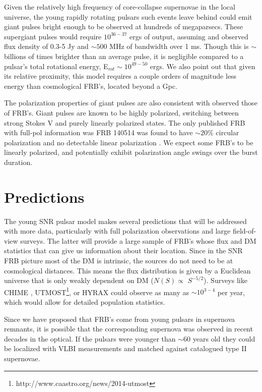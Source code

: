 \documentclass[useAMS,usenatbib]{mn2e}
\begin{document}
Given the relatively high frequency of core-collapse supernovae 
in the local universe, the young 
rapidly rotating pulsars such events leave behind could emit giant 
pulses bright enough to be observed at hundreds of megaparsecs. 
These supergiant pulses would require $10^{36 - 37}$ ergs of output,
assuming and observed flux density of 0.3-5 Jy and $\sim500$ 
MHz of bandwidth over 1 ms. Though this is $\sim$ billions of times
brighter than an average pulse, it is negligible compared to a 
pulsar's total rotational energy, E$_{rot} \sim 10^{49-50}$ ergs. We
also point out that given its relative proximity, this model requires
a couple orders of magnitude less energy than cosmological FRB's,
located beyond a Gpc. 

The polarization properties of giant pulses are also consistent with
observed those of FRB's. Giant pulses are known to be highly polarized, 
switching between strong Stokes V and purely linearly polarized states. 
The only published FRB with full-pol information was FRB 140514 was 
found to have $\sim20\%$ circular polarization and no detectable 
linear polarization \citep{2014arXiv1412.0342P}.  We expect some FRB's
to be linearly polarized, and potentially exhibit polarization angle
swings over the burst duration.

\section{Predictions}
\label{sec-predictions}

The young SNR pulsar model makes several predictions that will
be addressed with more data, particularly with full polarization 
observations and large field-of-view surveys. 
The latter will provide a large sample of FRB's whose flux and DM statistics
that can give us information about their location. Since in the SNR FRB picture
most of the DM is intrinsic, the sources do not need to be at cosmological 
distances. This means the flux distribution is given by a Euclidean universe
that is only weakly dependent on DM ($N(S) \propto$ $S^{-5/2}$). Surveys
like CHIME \citep{2014SPIE.9145E..22B}, 
UTMOST\footnote{http://www.caastro.org/news/2014-utmost},
 or HYRAX could observe as many as $\sim10^{3-4}$
per year, which would allow for detailed population statistics.

Since we have proposed that FRB's come from young pulsars 
in supernova remnants, it is possible that the corresponding 
supernova was observed in recent decades in the optical. If the pulsars
were younger than $\sim$60 years old they could be localized with VLBI
measurements and matched against catalogued type II supernovae. 
\end{document}
